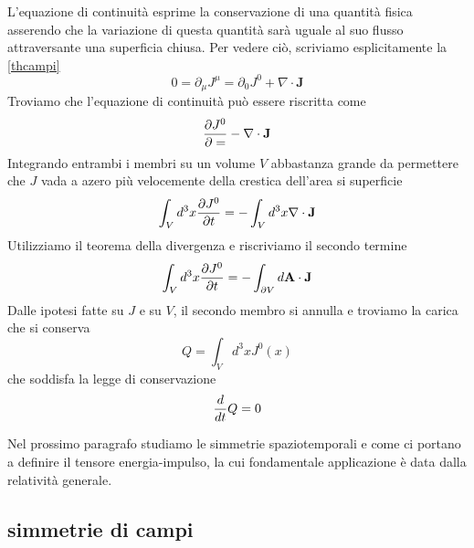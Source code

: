     L'equazione di continuità esprime la conservazione di una quantità fisica asserendo che la variazione di questa quantità sarà uguale al suo flusso attraversante una superficia chiusa. Per vedere ciò, scriviamo esplicitamente la \eqref{thcampi}
\begin{equation}
    0 = \partial_\mu J^\mu = \partial_0 J^0 + \nabla \cdot \mathbf J
\end{equation}
    Troviamo che l'equazione di continuità può essere riscritta come 
\begin{equation*}
    \frac{\partial J^0}{\partial=} - \nabla \cdot \mathbf J
\end{equation*}
    Integrando entrambi i membri su un volume $V$ abbastanza grande da permettere che $J$ vada a azero più velocemente della crestica dell'area si superficie
\begin{equation*}
    \int_V d^3 x \frac{\partial J^0}{\partial t} = - \int_V d^3 x \nabla \cdot \mathbf J
\end{equation*} 
    Utilizziamo il teorema della divergenza e riscriviamo il secondo termine 
\begin{equation*}
    \int_V d^3 x \frac{\partial J^0}{\partial t} = - \int_{\partial V} d \mathbf A \cdot \mathbf J
\end{equation*} 
    Dalle ipotesi fatte su $J$ e su $V$, il secondo membro si annulla e troviamo la carica che si conserva 
\begin{equation*}
    Q = \int_V d^3 x J^0(x)
\end{equation*} 
    che soddisfa la legge di conservazione
\begin{equation*}
    \frac{d}{dt} Q = 0 
\end{equation*}

    Nel prossimo paragrafo studiamo le simmetrie spaziotemporali e come ci portano a definire il tensore energia-impulso, la cui fondamentale applicazione è data dalla relatività generale. 


\subsection{simmetrie di campi}

